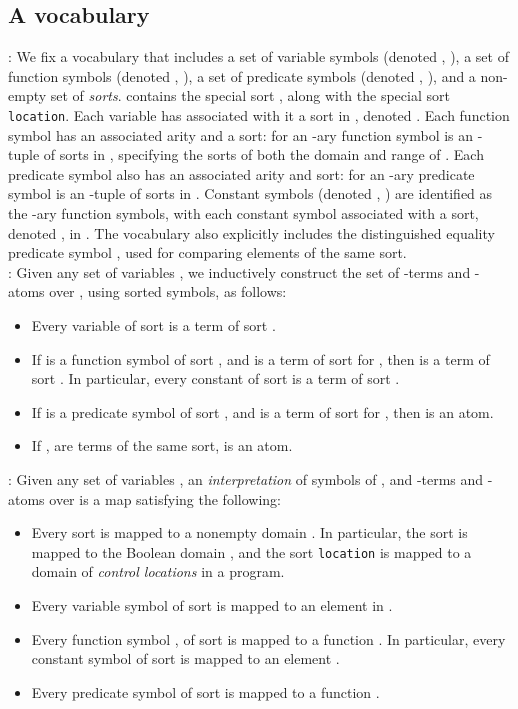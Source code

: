\subsection{A vocabulary }\label{sec:alpha}

: We fix a vocabulary 
that includes a set  of variable symbols (denoted ,
 \etc), a set  of function symbols (denoted ,
 \etc), a set  of predicate symbols (denoted ,
 \etc), and a non-empty set  of {\em sorts}.  
contains the special sort ,  along with the special sort
{\tt location}. Each variable  has associated with it a sort in
, denoted . Each function symbol  has an associated
arity and a sort:  for an -ary function symbol is an -tuple  of sorts in ,
specifying the sorts of both the domain and range of .  Each
predicate symbol  also has an associated arity and sort: 
for an -ary predicate symbol is an -tuple  of sorts in .  Constant symbols (denoted , 
\etc) are identified as the -ary function symbols, with each
constant symbol  associated with a sort, denoted , in
.  The vocabulary  also explicitly includes the
distinguished equality predicate symbol , used for comparing
elements of the same sort. \\

: 
Given any set of variables , we inductively
construct the set of -terms and -atoms over , 
using sorted symbols, as follows:

\begin{itemize}
\item Every variable of sort  is a term of sort .
\item If  is a function symbol of sort
, and  is a term of sort 
 for , then  is a 
term of sort .
In particular, every constant of sort  is a term of sort 
.
\item If  is a predicate symbol of sort , and  is a term of sort  for , then  is an atom.
\item If ,  are terms of the same sort,  
is an atom.
\end{itemize}

: 
Given any set of variables , an {\em
interpretation}  of symbols of , and -terms and -atoms
over  is a map satisfying the following: 

\begin{itemize}
\item Every sort  is mapped to a nonempty domain
. In particular, the sort  is mapped to the
Boolean domain , and the sort {\tt location} is
mapped to a domain of {\em control locations} in a program. 
\item Every variable symbol  of sort  is mapped to an
element  in .
\item Every function symbol , of sort  is mapped to a function . In particular, every constant symbol  of sort 
is mapped to an element . 
\item Every predicate symbol  of sort  
is mapped to a function . 
\end{itemize}

